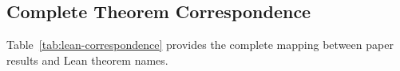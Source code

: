 %




\subsection{Complete Theorem Correspondence}

Table~\ref{tab:lean-correspondence} provides the complete mapping between paper results and Lean theorem names.

